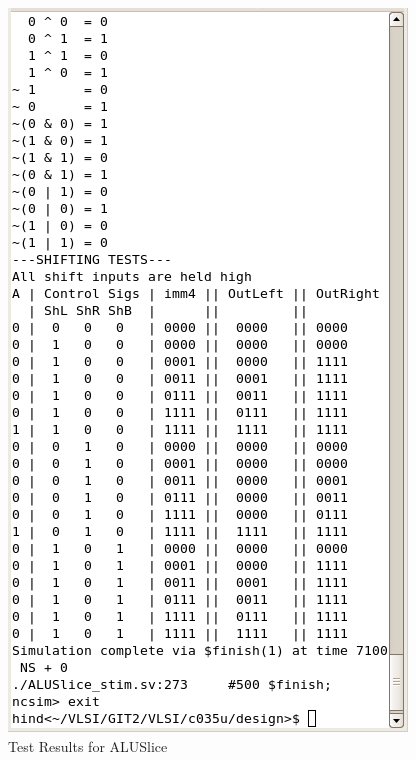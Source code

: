 \begin{figure}[h]
	\includegraphics[scale=0.72]{results/ALUSliceB.png}
	\caption{Test Results for ALUSlice}
	\label{fig:ALUSliceRes}
\end{figure}
